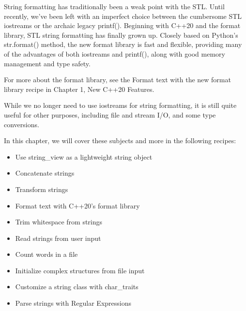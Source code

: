String formatting has traditionally been a weak point with the STL. Until recently, we've been left with an imperfect choice between the cumbersome STL iostreams or the archaic legacy printf(). Beginning with C++20 and the format library, STL string formatting has finally grown up. Closely based on Python's str.format() method, the new format library is fast and flexible, providing many of the advantages of both iostreams and printf(), along with good memory management and type safety.

For more about the format library, see the Format text with the new format library recipe in Chapter 1, New C++20 Features.

While we no longer need to use iostreams for string formatting, it is still quite useful for other purposes, including file and stream I/O, and some type conversions.

In this chapter, we will cover these subjects and more in the following recipes:

\begin{itemize}
\item 
Use string\_view as a lightweight string object

\item 
Concatenate strings

\item 
Transform strings

\item 
Format text with C++20's format library

\item 
Trim whitespace from strings

\item 
Read strings from user input

\item 
Count words in a file

\item 
Initialize complex structures from file input

\item 
Customize a string class with char\_traits

\item 
Parse strings with Regular Expressions
\end{itemize}

















